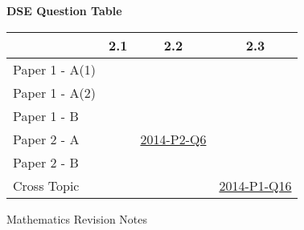 \documentclass[12pt, a4paper]{article}
\begin{document}
\begin{absolutelynopagebreak}
\begin{center}
\textbf{DSE Question Table}
\end{center}
\begin{center}
\begin{tabular}{|l|c|c|c|}
\hline
        & 2.1 & 2.2 & 2.3 \\\hline
\hline
Paper 1 - A(1)&  &  &  \\
\hline
Paper 1 - A(2)&  &  &  \\
\hline
Paper 1 - B&  &  &  \\
\hline
\hline
Paper 2 - A&  & \hyperref[DSE2014-CoreP2-Q06]{2014-P2-Q6} &  \\
\hline
Paper 2 - B&  &  &  \\
\hline
\hline
Cross Topic&  &  & \hyperref[DSE2014-CoreP1-Q16]{2014-P1-Q16} \\
\hline
\end{tabular}
\end{center}
\end{absolutelynopagebreak}
\newpage
\newpage
\thispagestyle{empty}
\begin{center}
Mathematics Revision Notes\\\vspace{1cm}
\\\vspace{1cm}
{\fontsize{24pt}{24pt}\selectfont {Percentages (II)}} \\\vspace{1cm}
\label{chapter:S3-3}

\end{center}
\vspace{0.5cm}
\hline
\end{document}
